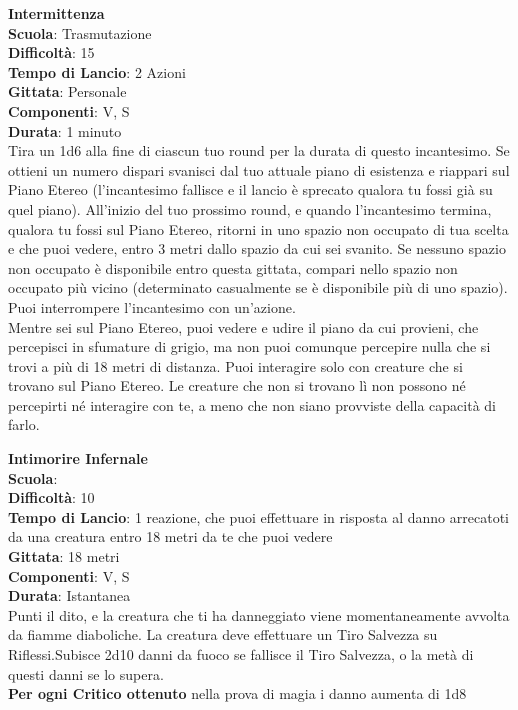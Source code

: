 \begin{multicols}{2}
\medskip\textbf{Intermittenza}\\
\textbf{Scuola}: Trasmutazione\\
\textbf{Difficoltà}:  15\\
\textbf{Tempo di Lancio}: 2 Azioni\\
\textbf{Gittata}: Personale\\
\textbf{Componenti}: V, S\\
\textbf{Durata}: 1 minuto\\
Tira un 1d6 alla fine di ciascun tuo round per la durata di questo incantesimo. Se ottieni un numero dispari svanisci dal tuo attuale piano di esistenza e riappari sul Piano Etereo (l'incantesimo fallisce e il lancio è sprecato qualora tu fossi già su quel piano). All'inizio del tuo prossimo round, e quando l'incantesimo termina, qualora tu fossi sul Piano Etereo, ritorni in uno spazio non occupato di tua scelta e che puoi vedere, entro 3 metri dallo spazio da cui sei svanito. Se nessuno spazio non occupato è disponibile entro questa gittata, compari nello spazio non occupato più vicino (determinato casualmente se è disponibile più di uno spazio). Puoi interrompere l'incantesimo con un'azione.\\
Mentre sei sul Piano Etereo, puoi vedere e udire il piano da cui provieni, che percepisci in sfumature di grigio, ma non puoi comunque percepire nulla che si trovi a più di 18 metri di distanza. Puoi interagire solo con creature che si trovano sul Piano Etereo. Le creature che non si trovano lì non possono né percepirti né interagire con te, a meno che non siano provviste della capacità di farlo.

\medskip\textbf{Intimorire Infernale}\\
\textbf{Scuola}: \\\textbf{Difficoltà}:  10\\
\textbf{Tempo di Lancio}: 1 reazione, che puoi effettuare in risposta al danno arrecatoti da una creatura entro 18 metri da te che puoi vedere\\
\textbf{Gittata}: 18 metri\\
\textbf{Componenti}: V, S\\
\textbf{Durata}: Istantanea\\
Punti il dito, e la creatura che ti ha danneggiato viene momentaneamente avvolta da fiamme diaboliche. La creatura deve effettuare un Tiro Salvezza su Riflessi.Subisce 2d10 danni da fuoco se  fallisce il Tiro Salvezza, o la metà di questi danni se lo supera.\\
\textbf{Per ogni Critico ottenuto} nella prova di magia i danno aumenta di 1d8


\end{multicols}

